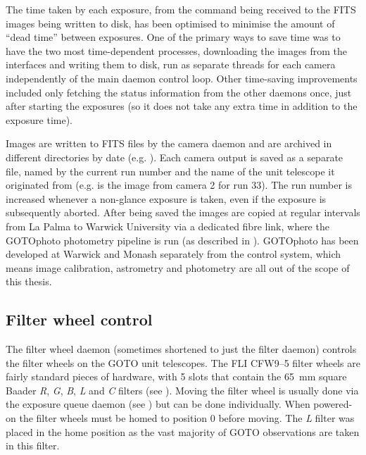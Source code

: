 \begin{colsection}
The time taken by each exposure, from the command being received to the FITS images being written to disk, has been optimised to minimise the amount of ``dead time'' between exposures. One of the primary ways to save time was to have the two most time-dependent processes, downloading the images from the interfaces and writing them to disk, run as separate threads for each camera independently of the main daemon control loop. Other time-saving improvements included only fetching the status information from the other daemons once, just after starting the exposures (so it does not take any extra time in addition to the exposure time).

Images are written to FITS files by the camera daemon and are archived in different directories by date (e.g. ). Each camera output is saved as a separate file, named by the current run number and the name of the unit telescope it originated from (e.g.  is the image from camera 2 for run 33). The run number is increased whenever a non-glance exposure is taken, even if the exposure is subsequently aborted. After being saved the images are copied at regular intervals from La Palma to Warwick University via a dedicated fibre link, where the GOTOphoto photometry pipeline is run (as described in ). GOTOphoto has been developed at Warwick and Monash separately from the control system, which means image calibration, astrometry and photometry are all out of the scope of this thesis.

\newpage

\end{colsection}


\subsection{Filter wheel control}
\label{sec:filt}
\begin{colsection}

The filter wheel daemon (sometimes shortened to just the filter daemon) controls the filter wheels on the GOTO unit telescopes. The FLI CFW9--5 filter wheels are fairly standard pieces of hardware, with 5 slots that contain the \SI{65}{\milli\metre} square Baader \textit{R}, \textit{G}, \textit{B}, \textit{L} and \textit{C} filters (see ). Moving the filter wheel is usually done via the exposure queue daemon (see ) but can be done individually. When powered-on the filter wheels must be homed to position 0 before moving. The \textit{L} filter was placed in the home position as the vast majority of GOTO observations are taken in this filter.

\end{colsection}

